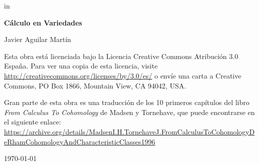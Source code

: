 \documentclass[twoside, 11pt]{report}
\begin{document}
 in

\thispagestyle{empty}

\begin{titlepage}
	\centering
	{\huge\bfseries Cálculo en Variedades \par}
	\vspace{2cm}
	{\Large Javier Aguilar Martín\par}
	\vspace{2.5cm}
	\vfill
	Esta obra está licenciada bajo la Licencia Creative Commons Atribución 3.0 España. Para ver una copia de esta licencia, visite \url{http://creativecommons.org/licenses/by/3.0/es/} o envíe una carta a Creative Commons, PO Box 1866, Mountain View, CA 94042, USA.

Gran parte de esta obra es una traducción de los 10 primeros capítulos del libro \emph{From Calculus To Cohomology} de Madsen y Tornehave, que puede encontrarse en el siguiente enlace: \url{https://archive.org/details/MadsenI.H.TornehaveJ.FromCalculusToCohomologyDeRhamCohomologyAndCharacteristicClasses1996}

	{\large \today\par}
\end{titlepage}
	


\begin{center}
\end{center}



\setcounter{page}{0}

\tableofcontents













\end{document}
